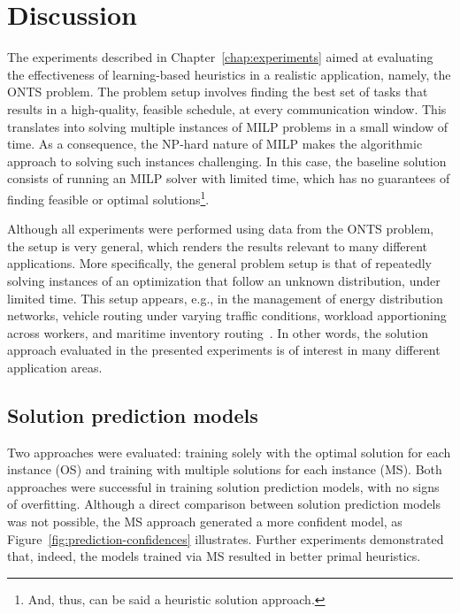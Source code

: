 

\chapter{Discussion}\label{chap:discussion}

The experiments described in Chapter~\ref{chap:experiments} aimed at evaluating the effectiveness of learning-based heuristics in a realistic application, namely, the ONTS problem.
The problem setup involves finding the best set of tasks that results in a high-quality, feasible schedule, at every communication window.
This translates into solving multiple instances of MILP problems in a small window of time.
As a consequence, the NP-hard nature of MILP makes the algorithmic approach to solving such instances challenging.
In this case, the baseline solution consists of running an MILP solver with limited time, which has no guarantees of finding feasible or optimal solutions\footnote{And, thus, can be said a heuristic solution approach.}.

Although all experiments were performed using data from the ONTS problem, the setup is very general, which renders the results relevant to many different applications.
More specifically, the general problem setup is that of repeatedly solving instances of an optimization that follow an unknown distribution, under limited time.
This setup appears, e.g., in the management of energy distribution networks, vehicle routing under varying traffic conditions, workload apportioning across workers, and maritime inventory routing~\cite{gasseMachineLearningCombinatorial2022,papageorgiouMIRPLibLibraryMaritime2014}.
In other words, the solution approach evaluated in the presented experiments is of interest in many different application areas.

\section{Solution prediction models}

Two approaches were evaluated: training solely with the optimal solution for each instance (OS) and training with multiple solutions for each instance (MS).
Both approaches were successful in training solution prediction models, with no signs of overfitting.
Although a direct comparison between solution prediction models was not possible, the MS approach generated a more confident model, as Figure~\ref{fig:prediction-confidences} illustrates.
Further experiments demonstrated that, indeed, the models trained via MS resulted in better primal heuristics.

